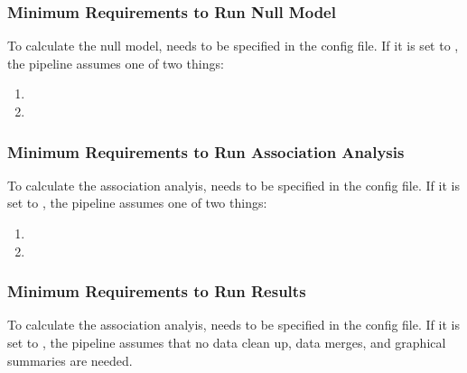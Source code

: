 \documentclass[letterpaper,10pt,english]{sphinxmanual}
\begin{document}
\subsubsection{Minimum Requirements to Run Null Model}
\label{\detokenize{nullModelParameters:minimum-requirements-to-run-null-model}}\label{\detokenize{nullModelParameters::doc}}
To calculate the null model,  needs to be specified in the config file.  If it is set to , the pipeline assumes one of two things:
\begin{enumerate}
%
\item {} 

\item {} 

\end{enumerate}


\subsubsection{Minimum Requirements to Run Association Analysis}
\label{\detokenize{assocAnalysisParameters:minimum-requirements-to-run-association-analysis}}\label{\detokenize{assocAnalysisParameters::doc}}
To calculate the association analyis,  needs to be specified in the config file.  If it is set to , the pipeline assumes one of two things:
\begin{enumerate}
%
\item {} 

\item {} 

\end{enumerate}


\subsubsection{Minimum Requirements to Run Results}
\label{\detokenize{resultsParameters:minimum-requirements-to-run-results}}\label{\detokenize{resultsParameters::doc}}
To calculate the association analyis,  needs to be specified in the config file.  If it is set to , the pipeline assumes that no data clean up, data merges, and graphical summaries are needed.
\end{document}

